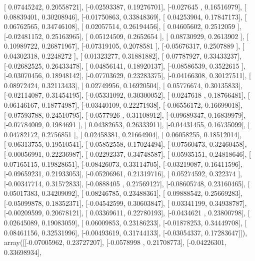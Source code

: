 \documentclass{article}
\begin{document}
       [ 0.07445242,  0.20558721],
       [-0.02593387,  0.19276701],
       [-0.027645  ,  0.16516979],
       [ 0.08839401,  0.30208946],
       [-0.01750863,  0.33848369],
       [ 0.04253904,  0.17847173],
       [ 0.06762565,  0.34746108],
       [ 0.02057514,  0.26194456],
       [ 0.04605602,  0.2512059 ],
       [-0.02481152,  0.25163965],
       [ 0.05124509,  0.2652654 ],
       [ 0.08730929,  0.2613902 ],
       [ 0.10989722,  0.26871967],
       [-0.07319105,  0.2078581 ],
       [-0.05676317,  0.2507889 ],
       [ 0.04302318,  0.2248272 ],
       [ 0.01323277,  0.31881882],
       [ 0.07787927,  0.33433237],
       [-0.02682525,  0.26433478],
       [ 0.04856141,  0.18920137],
       [-0.08586539,  0.3522615 ],
       [-0.03070456,  0.18948142],
       [-0.07703629,  0.23283375],
       [-0.04166308,  0.30127511],
       [ 0.08972424,  0.32113433],
       [ 0.02749956,  0.16920504],
       [ 0.05776674,  0.30135833],
       [-0.02114087,  0.31454195],
       [-0.05331092,  0.30300052],
       [ 0.0247618 ,  0.18766481],
       [ 0.06146167,  0.18774987],
       [-0.03440109,  0.22271938],
       [-0.06556172,  0.16699018],
       [-0.07593788,  0.24510795],
       [-0.0577926 ,  0.31108912],
       [-0.09689347,  0.16839979],
       [-0.07784009,  0.1984691 ],
       [ 0.04382653,  0.26333911],
       [-0.04431455,  0.16735099],
       [ 0.04782172,  0.2756851 ],
       [ 0.02458381,  0.21664904],
       [ 0.06058255,  0.18512014],
       [-0.06313755,  0.19510541],
       [ 0.05852558,  0.17024494],
       [-0.07560473,  0.32460458],
       [-0.00056991,  0.22236987],
       [ 0.02292337,  0.34748587],
       [ 0.05935151,  0.24818646],
       [ 0.07165115,  0.19828651],
       [-0.08426073,  0.33114705],
       [-0.03219087,  0.16411596],
       [-0.09659231,  0.21933053],
       [-0.05206961,  0.21319716],
       [ 0.05274592,  0.322374  ],
       [-0.00347714,  0.31572833],
       [-0.0888405 ,  0.27569127],
       [-0.08605748,  0.23160465],
       [ 0.05017383,  0.34209092],
       [ 0.08246785,  0.23488361],
       [ 0.09888542,  0.25669283],
       [-0.05099878,  0.18352371],
       [-0.04542599,  0.30603847],
       [ 0.03341199,  0.34938787],
       [-0.00209599,  0.20678121],
       [ 0.03369611,  0.22780193],
       [-0.0434621 ,  0.23800798],
       [ 0.02645089,  0.19083059],
       [ 0.06009853,  0.23186233],
       [-0.01878253,  0.34449708],
       [ 0.08461156,  0.32531996],
       [-0.00493619,  0.31744133],
       [-0.03054337,  0.17283647]]), array([[-0.07005962,  0.23727207],
       [-0.0578998 ,  0.21708773],
       [-0.04226301,  0.33698934],
\end{document}
